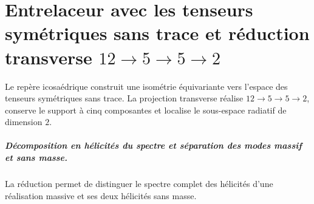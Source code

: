 \chapter{Entrelaceur avec les tenseurs symétriques sans trace et réduction transverse \texorpdfstring{\(12\to5\to5\to2\)}{12→5→5→2}}
\label{chap:parte-iv-64}

Le repère icosaédrique construit une isométrie équivariante vers l’espace des tenseurs symétriques sans trace. La projection transverse réalise \(12\to5\to5\to2\), conserve le support à cinq composantes et localise le sous-espace radiatif de dimension \(2\).



\paragraph{Décomposition en hélicités du spectre et séparation des modes massif et sans masse.} La réduction permet de distinguer le spectre complet des hélicités d’une réalisation massive et ses deux hélicités sans masse.
